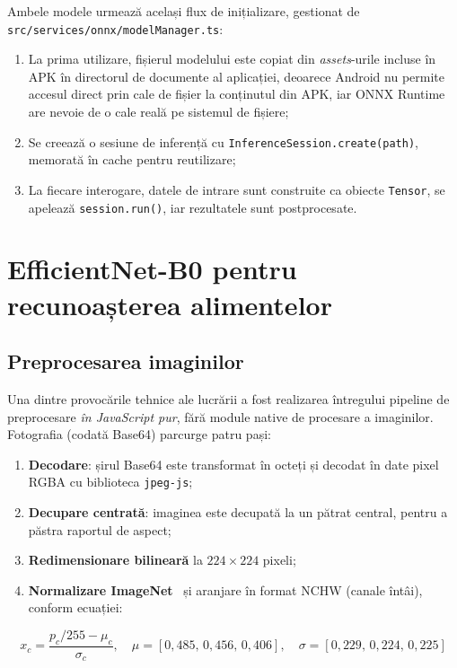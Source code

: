 \documentclass[12pt, a4paper, twoside]{report}
\numberwithin{equation}{section}
\begin{document}
Ambele modele urmează același flux de inițializare, gestionat de
\texttt{src/\allowbreak services/\allowbreak onnx/\allowbreak modelManager.ts}:
\begin{enumerate}
  \item La prima utilizare, fișierul modelului este copiat din \textit{assets}-urile
    incluse în APK în directorul de documente al aplicației, deoarece Android nu permite
    accesul direct prin cale de fișier la conținutul din APK, iar ONNX Runtime are nevoie de
    o cale reală pe sistemul de fișiere;
  \item Se creează o sesiune de inferență cu \texttt{InferenceSession.create(path)},
    memorată în cache pentru reutilizare;
  \item La fiecare interogare, datele de intrare sunt construite ca obiecte \texttt{Tensor},
    se apelează \texttt{session.run()}, iar rezultatele sunt postprocesate.
\end{enumerate}

\section{EfficientNet-B0 pentru recunoașterea alimentelor}

\subsection{Preprocesarea imaginilor}

Una dintre provocările tehnice ale lucrării a fost realizarea întregului pipeline de
preprocesare \emph{în JavaScript pur}, fără module native de procesare a imaginilor.
Fotografia (codată Base64) parcurge patru pași:

\begin{enumerate}
  \item \textbf{Decodare}: șirul Base64 este transformat în octeți și decodat în date pixel
    RGBA cu biblioteca \texttt{jpeg-js};
  \item \textbf{Decupare centrată}: imaginea este decupată la un pătrat central, pentru a
    păstra raportul de aspect;
  \item \textbf{Redimensionare bilineară} la $224\times224$ pixeli;
  \item \textbf{Normalizare ImageNet}~\cite{imagenet} și aranjare în format NCHW (canale întâi), conform
    ecuației:
\end{enumerate}

\begin{equation}
x_c = \frac{p_c/255 - \mu_c}{\sigma_c}, \quad
\mu = [0{,}485,\,0{,}456,\,0{,}406], \quad
\sigma = [0{,}229,\,0{,}224,\,0{,}225]
\end{equation}
\end{document}
